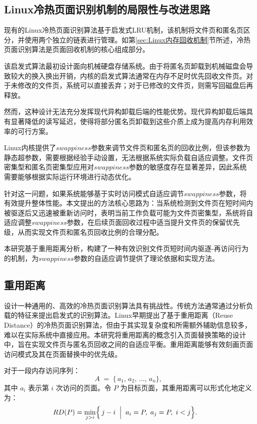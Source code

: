 \subsection{Linux冷热页面识别机制的局限性与改进思路}
现有的Linux冷热页面识别算法基于启发式LRU机制，该机制将文件页和匿名页区分，并使用两个独立的链表进行管理。如第\ref{sec:Linux内存回收机制}节所述，冷热页面识别算法是页面回收机制的核心组成部分。

该启发式算法最初设计面向机械硬盘存储系统。由于将匿名页卸载到机械磁盘会导致较大的换入换出开销，内核的启发式算法通常在内存不足时优先回收文件页。对于未修改的文件页，系统可以直接丢弃；对于已修改的文件页，则需写回磁盘后再释放。

然而，这种设计无法充分发挥现代异构卸载后端的性能优势。现代异构卸载后端具有显著降低的读写延迟，使得将部分匿名页卸载到这些介质上成为提高内存利用效率的可行方案。

Linux内核提供了\(swappiness\)参数来调节文件页和匿名页的回收比例，但该参数为静态超参数，需要根据经验手动设置，无法根据系统实际负载自适应调整。文件页密集型和匿名页密集型应用对\(swappiness\)参数的敏感度存在显著差异，因此系统需要能够根据实际运行环境进行动态优化。

针对这一问题，如果系统能够基于实时访问模式自适应调节\(swappiness\)参数，将有效提升整体性能。本文提出的方法核心思路为：当系统检测到文件页在短时间内被驱逐后又迅速被重新访问时，表明当前工作负载可能为文件页密集型，系统将自适应调整\(swappiness\)参数，在后续页面回收过程中适当提升文件页的保留优先级，从而实现文件页和匿名页回收比例的合理分配。

本研究基于重用距离分析，构建了一种有效识别文件页短时间内驱逐-再访问行为的机制，为\(swappiness\)参数的自适应调节提供了理论依据和实现方法。

\subsection{重用距离}

设计一种通用的、高效的冷热页面识别算法具有挑战性。传统方法通常通过分析负载的特征来提出启发式的识别算法。Linux早期提出了基于重用距离（Reuse Distance）的冷热页面识别算法，但由于其实现复杂度和所需额外辅助信息较多，难以在实际系统中直接应用。本研究将重用距离的概念引入页面替换策略的设计中，旨在实现文件页与匿名页回收之间的自适应平衡。重用距离能够有效刻画页面访问模式及其在页面替换中的优先级。

对于一段内存访问序列：
\[
  A \;=\;\{\,a_1,\,a_2,\,\dots,\,a_n\},
\]
其中 \(a_i\) 表示第 \(i\) 次访问的页面。令 \(P\) 为目标页面，其重用距离可以形式化地定义为：
\begin{align}
\label{eq:rd_def}
  RD(P) 
  &= 
  \min_{j>i}\Bigl\{\,j - i
    \;\Bigm|\;
    a_i = P,\;
    a_j = P,\;
    i < j
  \Bigr\}.
\end{align}

